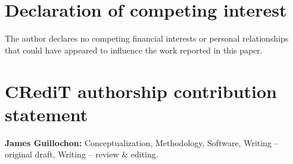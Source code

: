 \documentclass[final,5p]{elsarticle}
\begin{document}
\section*{Declaration of competing interest}
The author declares no competing financial interests or personal relationships that could have appeared to influence the work reported in this paper.

\section*{CRediT authorship contribution statement}
\textbf{James Guillochon:} Conceptualization, Methodology, Software, Writing -- original draft, Writing -- review \& editing.



\end{document}

